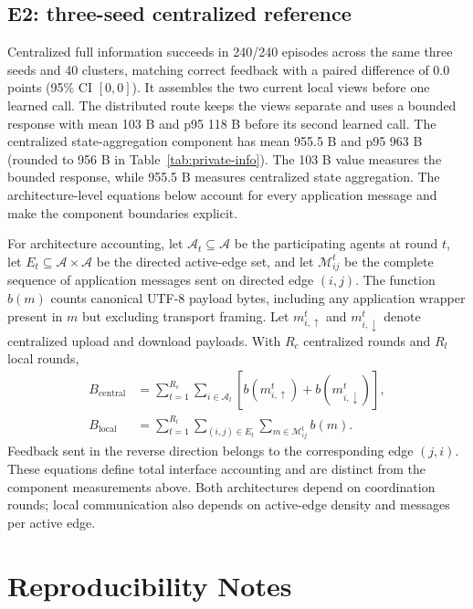 \documentclass[10pt]{article}
\begin{document}
\subsection{E2: three-seed centralized reference}

Centralized full information succeeds in 240/240 episodes across the same three seeds and 40 clusters, matching correct feedback with a paired difference of 0.0 points (95\% CI $[0,0]$). It assembles the two current local views before one learned call. The distributed route keeps the views separate and uses a bounded response with mean 103 B and p95 118 B before its second learned call. The centralized state-aggregation component has mean 955.5 B and p95 963 B (rounded to 956 B in Table~\ref{tab:private-info}). The 103 B value measures the bounded response, while 955.5 B measures centralized state aggregation. The architecture-level equations below account for every application message and make the component boundaries explicit.

\begin{samepage}
For architecture accounting, let $\mathcal A_t\subseteq\mathcal A$ be the participating agents at round $t$, let $E_t\subseteq\mathcal A\times\mathcal A$ be the directed active-edge set, and let $\mathcal M_{ij}^t$ be the complete sequence of application messages sent on directed edge $(i,j)$. The function $b(m)$ counts canonical UTF-8 payload bytes, including any application wrapper present in $m$ but excluding transport framing. Let $m_{i,\uparrow}^{t}$ and $m_{i,\downarrow}^{t}$ denote centralized upload and download payloads. With $R_c$ centralized rounds and $R_l$ local rounds,
\begin{align}
B_{\mathrm{central}}
  &= \sum_{t=1}^{R_c}\sum_{i\in\mathcal A_t}
     \left[b(m_{i,\uparrow}^{t})+b(m_{i,\downarrow}^{t})\right], \\
B_{\mathrm{local}}
  &= \sum_{t=1}^{R_l}\sum_{(i,j)\in E_t}
     \sum_{m\in\mathcal M_{ij}^{t}} b(m).
\end{align}
Feedback sent in the reverse direction belongs to the corresponding edge $(j,i)$. These equations define total interface accounting and are distinct from the component measurements above. Both architectures depend on coordination rounds; local communication also depends on active-edge density and messages per active edge.
\end{samepage}

\section{Reproducibility Notes}
\label{sec:supp-artifact}
\end{document}
